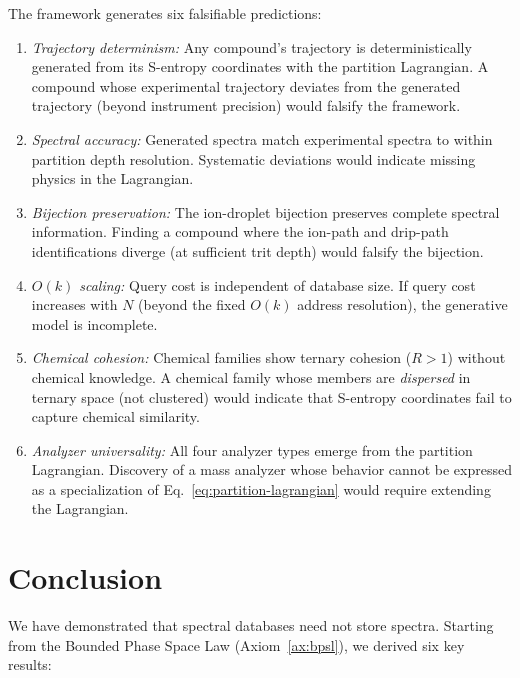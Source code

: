 \documentclass[11pt,twocolumn,a4paper]{article}
\theoremstyle{definition}
\theoremstyle{remark}
\begin{document}
The framework generates six falsifiable predictions:
\begin{enumerate}
  \item \emph{Trajectory determinism:} Any compound's trajectory is deterministically generated from its S-entropy coordinates with the partition Lagrangian. A compound whose experimental trajectory deviates from the generated trajectory (beyond instrument precision) would falsify the framework.

  \item \emph{Spectral accuracy:} Generated spectra match experimental spectra to within partition depth resolution. Systematic deviations would indicate missing physics in the Lagrangian.

  \item \emph{Bijection preservation:} The ion-droplet bijection preserves complete spectral information. Finding a compound where the ion-path and drip-path identifications diverge (at sufficient trit depth) would falsify the bijection.

  \item \emph{$O(k)$ scaling:} Query cost is independent of database size. If query cost increases with $N$ (beyond the fixed $O(k)$ address resolution), the generative model is incomplete.

  \item \emph{Chemical cohesion:} Chemical families show ternary cohesion ($R > 1$) without chemical knowledge. A chemical family whose members are \emph{dispersed} in ternary space (not clustered) would indicate that S-entropy coordinates fail to capture chemical similarity.

  \item \emph{Analyzer universality:} All four analyzer types emerge from the partition Lagrangian. Discovery of a mass analyzer whose behavior cannot be expressed as a specialization of Eq.~\eqref{eq:partition-lagrangian} would require extending the Lagrangian.
\end{enumerate}

\section{Conclusion}
\label{sec:conclusion}

We have demonstrated that spectral databases need not store spectra. Starting from the Bounded Phase Space Law (Axiom~\ref{ax:bpsl}), we derived six key results:
\end{document}
